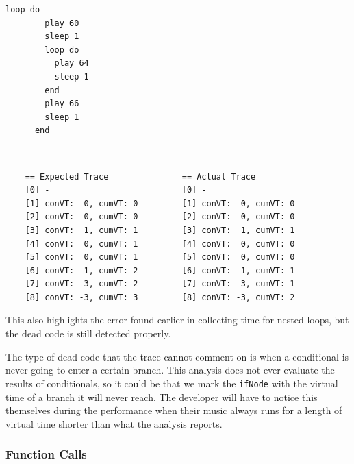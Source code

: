 \documentclass[11pt, abstracton, twoside, titlepage=true]{scrartcl}
\begin{document}
\begin{minipage}{\textwidth}
	\begin{lstlisting}[style = sonicpi]
      loop do
        play 60
        sleep 1
        loop do
          play 64
          sleep 1
        end
        play 66
        sleep 1
      end
	\end{lstlisting}
\end{minipage}
\\
\begin{lstlisting}
    == Expected Trace               == Actual Trace
    [0] -                           [0] -
    [1] conVT:  0, cumVT: 0         [1] conVT:  0, cumVT: 0
    [2] conVT:  0, cumVT: 0         [2] conVT:  0, cumVT: 0
    [3] conVT:  1, cumVT: 1         [3] conVT:  1, cumVT: 1
    [4] conVT:  0, cumVT: 1         [4] conVT:  0, cumVT: 0
    [5] conVT:  0, cumVT: 1         [5] conVT:  0, cumVT: 0
    [6] conVT:  1, cumVT: 2         [6] conVT:  1, cumVT: 1
    [7] conVT: -3, cumVT: 2         [7] conVT: -3, cumVT: 1
    [8] conVT: -3, cumVT: 3         [8] conVT: -3, cumVT: 2
\end{lstlisting}

This also highlights the error found earlier in collecting time for nested loops, 
but the dead code is still detected properly.

The type of dead code that the trace cannot comment on is when a conditional is 
never going to enter a certain branch. This analysis does not ever evaluate the 
results of conditionals, so it could be that we mark the \texttt{ifNode} with the 
virtual time of a branch it will never reach. The developer will have to notice this 
themselves during the performance when their music always runs for a length of 
virtual time shorter than what the analysis reports.

\subsubsection{Function Calls} \label{evalFunc}
\end{document}
